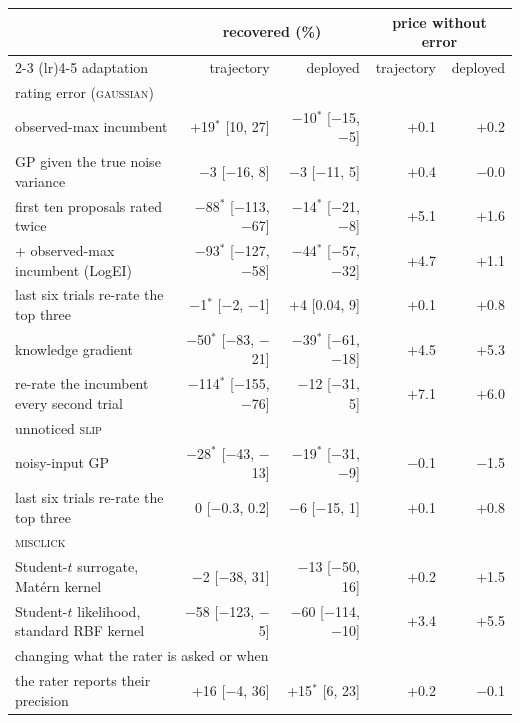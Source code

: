 \begin{tabular}{lrrrr}
\toprule
& \multicolumn{2}{c}{recovered (\%)} & \multicolumn{2}{c}{price without error} \\
\cmidrule(lr){2-3} \cmidrule(lr){4-5}
adaptation & trajectory & deployed & trajectory & deployed \\
\midrule
\multicolumn{5}{l}{rating error (\textsc{gaussian})} \\
observed-max incumbent & +19$^{*}$ {\scriptsize [10, 27]} & $-$10$^{*}$ {\scriptsize [$-$15, $-$5]} & +0.1 & +0.2 \\
GP given the true noise variance & $-$3 {\scriptsize [$-$16, 8]} & $-$3 {\scriptsize [$-$11, 5]} & +0.4 & $-$0.0 \\
first ten proposals rated twice & $-$88$^{*}$ {\scriptsize [$-$113, $-$67]} & $-$14$^{*}$ {\scriptsize [$-$21, $-$8]} & +5.1 & +1.6 \\
\quad + observed-max incumbent (LogEI) & $-$93$^{*}$ {\scriptsize [$-$127, $-$58]} & $-$44$^{*}$ {\scriptsize [$-$57, $-$32]} & +4.7 & +1.1 \\
last six trials re-rate the top three & $-$1$^{*}$ {\scriptsize [$-$2, $-$1]} & +4 {\scriptsize [0.04, 9]} & +0.1 & +0.8 \\
knowledge gradient & $-$50$^{*}$ {\scriptsize [$-$83, $-$21]} & $-$39$^{*}$ {\scriptsize [$-$61, $-$18]} & +4.5 & +5.3 \\
re-rate the incumbent every second trial & $-$114$^{*}$ {\scriptsize [$-$155, $-$76]} & $-$12 {\scriptsize [$-$31, 5]} & +7.1 & +6.0 \\
\multicolumn{5}{l}{unnoticed \textsc{slip}} \\
noisy-input GP & $-$28$^{*}$ {\scriptsize [$-$43, $-$13]} & $-$19$^{*}$ {\scriptsize [$-$31, $-$9]} & $-$0.1 & $-$1.5 \\
last six trials re-rate the top three & 0 {\scriptsize [$-$0.3, 0.2]} & $-$6 {\scriptsize [$-$15, 1]} & +0.1 & +0.8 \\
\multicolumn{5}{l}{\textsc{misclick}} \\
Student-$t$ surrogate, Mat\'ern kernel & $-$2 {\scriptsize [$-$38, 31]} & $-$13 {\scriptsize [$-$50, 16]} & +0.2 & +1.5 \\
Student-$t$ likelihood, standard RBF kernel & $-$58 {\scriptsize [$-$123, $-$5]} & $-$60 {\scriptsize [$-$114, $-$10]} & +3.4 & +5.5 \\
\multicolumn{5}{l}{changing what the rater is asked or when} \\
the rater reports their precision & +16 {\scriptsize [$-$4, 36]} & +15$^{*}$ {\scriptsize [6, 23]} & +0.2 & $-$0.1 \\

\end{tabular}
